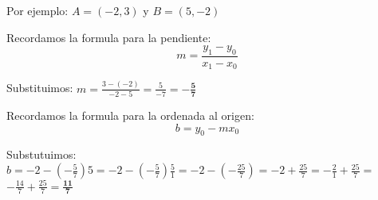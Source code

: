 \documentclass[a4paper,10pt]{article}
\title{}
\author{}
\date{}
\begin{document}
Por ejemplo:
 $A= (-2, 3)$ y $B=(5, -2)$

Recordamos la formula para la pendiente:
$$m=\frac{y_1-y_0}{x_1-x_0}$$

Substituimos:
$m=\frac{3-(-2)}{-2-5}=\frac{5}{-7}=\mathbf{-\frac{5}{7}}$

Recordamos la formula para la ordenada al origen:
$$b=y_0-mx_0$$

Substutuimos:
$b=-2-(-\frac{5}{7})5=-2-(-\frac{5}{7})\frac{5}{1}=-2-(-\frac{25}{7})=-2+\frac{25}{7}=-\frac{2}{1}+\frac{25}{7}=$
\\
$-\frac{14}{7}+\frac{25}{7}=\mathbf{\frac{11}{7}}$
\end{document}
